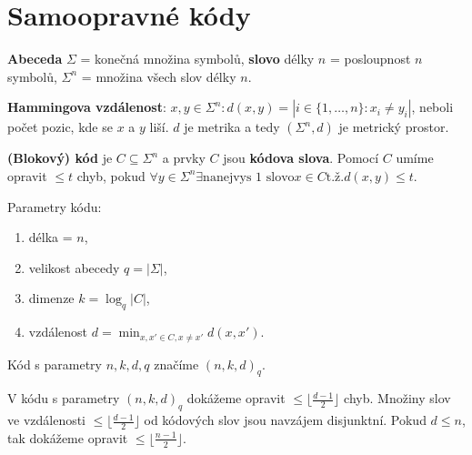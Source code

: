 \chapter{Samoopravné kódy}

\begin{definice}
	\textbf{Abeceda} $\Sigma$ = konečná množina symbolů, \textbf{slovo} délky $n$ = posloupnost $n$ symbolů, $\Sigma^n$ = množina všech slov délky $n$.
\end{definice}

\begin{definice}
	\textbf{Hammingova vzdálenost}: $x,y \in \Sigma^n : d(x,y) = |{i \in \{1,\dots ,n\}: x_i \neq y_i}|$, neboli počet pozic, kde se $x$ a $y$ liší. $d$ je metrika a tedy $(\Sigma^n, d)$ je metrický prostor.
\end{definice}

\begin{definice}
	\textbf{(Blokový) kód} je $C \subseteq \Sigma^n$ a prvky $C$ jsou \textbf{kódova slova}. Pomocí $C$ umíme opravit $\leq t$ chyb, pokud $\forall y \in \Sigma^n \exists \text{nanejvys 1 slovo} x \in C \text{t.ž.} d(x,y)\leq t$.
\end{definice}

\begin{definice}
	Parametry kódu:
	
	\begin{enumerate}
		\item délka = $n$,
		\item velikost abecedy $q = |\Sigma|$,
		\item dimenze $k = \log_q|C|$,
		\item vzdálenost $d = \min_{x, x' \in C, x \neq x'} d(x, x')$. 
	\end{enumerate}
	
	Kód s parametry $n,k,d,q$ značíme $(n,k,d)_q$.
\end{definice}

V kódu s parametry $(n,k,d)_q$ dokážeme opravit $\leq \lfloor \frac{d-1}{2} \rfloor$ chyb. Množiny slov ve vzdálenosti $\leq \lfloor \frac{d-1}{2} \rfloor$ od kódových slov jsou navzájem disjunktní. Pokud $d \leq n$, tak dokážeme opravit $\leq \lfloor \frac{n-1}{2} \rfloor$.

